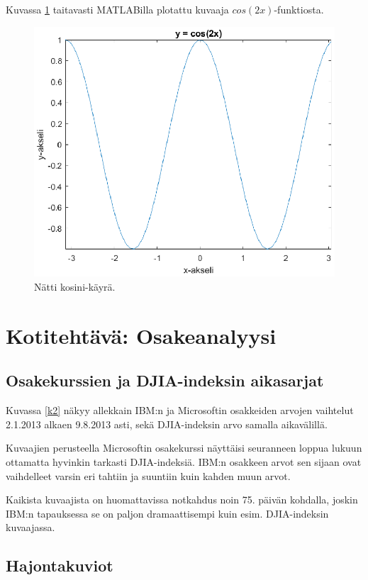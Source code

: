 \documentclass[a4paper,11pt]{article}
\begin{document}
{Kuvassa \ref{k1} taitavasti MATLABilla plotattu kuvaaja $cos(2x)$-funktiosta.

\clearpage

\begin{figure}
    \centering
    \includegraphics[width= 120mm]{kuva1-kosini.eps}
    \caption{Nätti kosini-käyrä.}
    \label{k1}
\end{figure}

\clearpage

\section{Kotitehtävä: Osakeanalyysi}

\subsection{Osakekurssien ja DJIA-indeksin aikasarjat}

Kuvassa \ref{k2} näkyy allekkain IBM:n ja Microsoftin osakkeiden arvojen vaihtelut 2.1.2013 alkaen 9.8.2013 asti, sekä DJIA-indeksin arvo samalla aikavälillä.

Kuvaajien perusteella Microsoftin osakekurssi näyttäisi seuranneen loppua lukuun ottamatta hyvinkin tarkasti DJIA-indeksiä. IBM:n osakkeen arvot sen sijaan ovat vaihdelleet varsin eri tahtiin ja suuntiin kuin kahden muun arvot.

Kaikista kuvaajista on huomattavissa notkahdus noin 75. päivän kohdalla, joskin IBM:n tapauksessa se on paljon dramaattisempi kuin esim. DJIA-indeksin kuvaajassa.

\subsection{Hajontakuviot}

}
\end{document}
